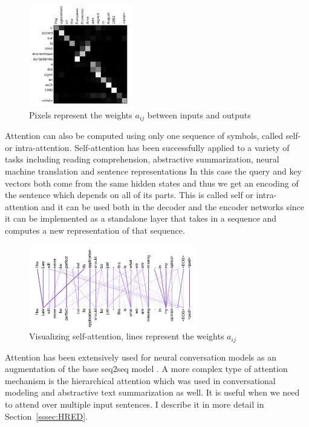 \documentclass[12pt]{article}
\begin{document}
\begin{figure}[H]
	\centering
	\includegraphics[width=0.4\textwidth]{pics/attn_weights.png}
	\caption{Pixels represent the weights \(a_{ij}\) between inputs and outputs \cite{Bahdanau:2014}}
	\label{fig:attentionb}
\end{figure}
Attention can also be computed using only one sequence of symbols, called self- or intra-attention. Self-attention has been successfully applied to a variety of tasks including reading comprehension, abstractive summarization, neural machine translation and sentence representations \cite{Cheng:2016,Lin:2017,Vaswani:2017,Parikh:2016,Paulus:2017} In this case the query and key vectors both come from the same hidden states and thus we get an encoding of the sentence which depends on all of its parts. This is called self or intra-attention and it can be used both in the decoder and the encoder networks since it can be implemented as a standalone layer that takes in a sequence and computes a new representation of that sequence. 
\begin{figure}[H]
	\centering
	\includegraphics[width=0.65\textwidth]{pics/self_attn.png}
	\caption{Visualizing self-attention, lines represent the weights \(a_{ij}\) \cite{Vaswani:2017}}
	\label{fig:attentionc}
\end{figure}

Attention has been extensively used for neural conversation models as an augmentation of the base seq2seq model \cite{Yao:2016,Shang:2015,Xing_topic:2017,Zhao:2017}. A more complex type of attention mechanism is the hierarchical attention which was used in conversational modeling \cite{Xing:2017} and abstractive text summarization \cite{Nallapati:2016} as well. It is useful when we need to attend over multiple input sentences. I describe it in more detail in Section~\ref{sssec:HRED}.
\end{document}
